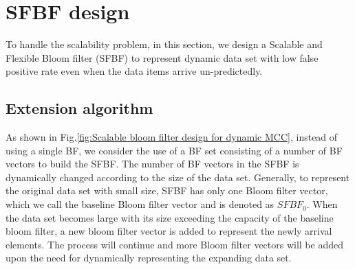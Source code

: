 \documentclass[10pt,journal,compsoc]{IEEEtran}
\newcommand{\rev}[1]{#1}
\newcommand{\del}[1]{\sout{#1}}  %
\begin{document}
\section{SFBF  design}
\label{sec:Scalable and rate-dependent bloom filter}
To handle the scalability problem, in this section, we design a Scalable and Flexible Bloom filter (SFBF) to represent dynamic data set with low false positive rate even when the data items arrive un-predictedly.





\subsection{Extension algorithm}
\label{subsec:Extension algorithm}
As shown in Fig.\ref{fig:Scalable bloom filter design for dynamic MCC}, instead of using a single BF, we consider the use of a BF set consisting of a number of BF vectors to build the SFBF. \rev{The number of BF vectors in the SFBF is dynamically changed according to the size of the data set.}
\rev{Generally, to represent the original data set with small size,}  SFBF has only one Bloom filter vector, which we call the baseline Bloom filter vector and is denoted as $SFBF_0$. When the data set becomes large with its size exceeding the capacity of the baseline bloom filter, a new bloom filter vector is added to represent the newly arrival elements. The process will continue and more Bloom filter vectors will be added  upon the need  for dynamically representing the expanding data set.
\end{document}
